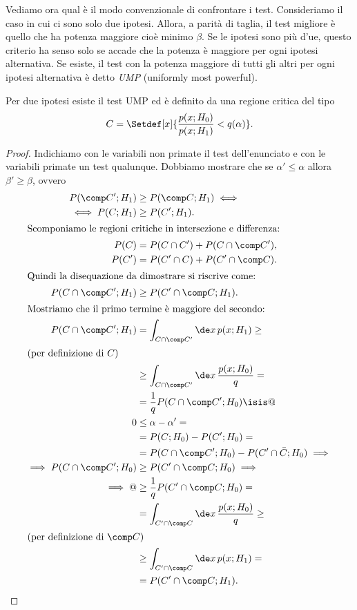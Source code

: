Vediamo ora qual è il modo convenzionale di confrontare i test.
Consideriamo il caso in cui ci sono solo due ipotesi.
Allora, a parità di taglia,
il test migliore è quello che ha potenza maggiore cioè minimo $\beta$.
Se le ipotesi sono più d'ue,
questo criterio ha senso solo se accade che la potenza è maggiore per ogni ipotesi alternativa.
Se esiste, il test con la potenza maggiore di tutti gli altri per ogni ipotesi alternativa è detto
\emph{UMP} (uniformly most powerful).

\begin{theorem}
	\label{th:np}
	Per due ipotesi esiste il test UMP
	ed è definito da una regione critica del tipo
	\begin{equation*}
		C = \Setdef[x]{\frac{p(x;H_0)}{p(x;H_1)} < q(\alpha)}.
	\end{equation*}
\end{theorem}

\begin{proof}
	Indichiamo con le variabili non primate il test dell'enunciato
	e con le variabili primate un test qualunque.
	Dobbiamo mostrare che se $\alpha'\le\alpha$ allora $\beta'\ge\beta$,
	ovvero
	\begin{align*}
		P(\comp C';H_1)
		&\ge P(\comp C;H_1) \iff \\
		\iff P(C;H_1)
		&\ge P(C';H_1). \\
		\intertext{Scomponiamo le regioni critiche in intersezione e differenza:}
		P(C)
		&= P(C\cap C') + P(C\cap\comp C'), \\
		P(C')
		&= P(C'\cap C) + P(C'\cap\comp C). \\
		\intertext{Quindi la disequazione da dimostrare si riscrive come:}
		P(C\cap\comp C';H_1)
		&\ge P(C'\cap\comp C;H_1). \\
		\intertext{Mostriamo che il primo termine è maggiore del secondo:}
		P(C\cap\comp C';H_1)
		&= \int_{C\cap\comp C'} \de x\, p(x;H_1) \ge \\
		\intertext{(per definizione di $C$)}
		&\ge \int_{C\cap\comp C'} \de x\, \frac{p(x;H_0)}q = \\
		&= \frac1q P(C\cap\comp C';H_0) \isis @ \\
		0
		&\le \alpha - \alpha' = \\
		&= P(C;H_0) - P(C';H_0) = \\
		&= P(C\cap\comp C';H_0) - P(C'\cap\bar C;H_0) \implies \\
		\implies P(C\cap\comp C';H_0)
		&\ge P(C'\cap\comp C;H_0) \implies \\
		\implies @
		&\ge \frac1q P(C'\cap\comp C;H_0) = \\
		&= \int_{C'\cap\comp C} \de x\, \frac{p(x;H_0)}q \ge \\
		\intertext{(per definizione di $\comp C$)}
		&\ge \int_{C'\cap\comp C} \de x\, p(x;H_1) = \\
		&= P(C'\cap\comp C;H_1). \qedhere
	\end{align*}
\end{proof}

